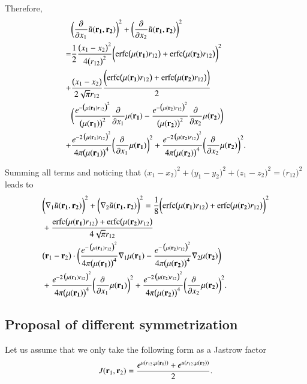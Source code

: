 \documentclass[aip,jcp,reprint,noshowkeys,superscriptaddress]{revtex4-1}
\newcommand{\deriv}[3]{\frac{\partial^{#3} #1}{\partial {#2}^{#3}}}
\newcommand{\bd}[1]{{\bf {#1}}}
\newcommand{\br}[0]{{\bf {r}}}
\newcommand{\bri}[1]{{\bf r}_{#1}}
\newcommand{\mur}[1]{\mu({\bf r_{#1}})}
\begin{document}
Therefore, 
\begin{equation}
 \begin{aligned}
& \bigg(\deriv{}{x_1}{}\tilde{u}(\bd{r_1},\bd{r_2}) \bigg)^2 + \bigg(\deriv{}{x_2}{}\tilde{u}(\bd{r_1},\bd{r_2}) \bigg)^2  \\
 = & \frac{1}{2}\frac{\big( x_1 - x_2 \big)^2}{4 \big(r_{12}\big)^2} \bigg(\text{erfc}\big(\mur{1} r_{12}\big) + \text{erfc}\big(\mur{2} r_{12}\big) \bigg)^2  \\
 + & \frac{\big(x_1 - x_2\big)}{2 \sqrt{\pi}r_{12}}  \frac{\bigg(\text{erfc}\big(\mur{1} r_{12}\big) + \text{erfc}\big(\mur{2} r_{12}\big) \bigg)}{2} \\
&\bigg(   \frac{e^{-\big(\mur{1} r_{12}\big)^2}}{\big(\mur{1}\big)^2} \deriv{}{x_1}{}\mur{1} 
- \frac{e^{-\big(\mur{2} r_{12}\big)^2}}{\big(\mur{2}\big)^2} \deriv{}{x_2}{}\mur{2} \bigg) \\
 + & \frac{e^{-2 \,\big(\mur{1}r_{12} \big)^2}}{4\pi \big(\mur{1}\big)^4} \bigg( \deriv{}{x_1}{}\mur{1} \bigg)^2 
 + \frac{e^{-2 \,\big(\mur{2}r_{12} \big)^2}}{4\pi \big(\mur{2}\big)^4} \bigg( \deriv{}{x_2}{}\mur{2} \bigg)^2.
 \end{aligned}
\end{equation}

Summing all terms and noticing that $\bigg(x_1 - x_2\bigg)^2 + \bigg(y_1 - y_2\bigg)^2 + \bigg(z_1 - z_2\bigg)^2 = \bigg(r_{12}\bigg)^2$ leads to 
\begin{equation}
 \begin{aligned}
& \bigg(\nabla_1\tilde{u}(\bd{r_1},\bd{r_2})\bigg)^2 + \bigg(\nabla_2\tilde{u}(\bd{r_1},\bd{r_2})\bigg)^2 = 
  \frac{1}{8}\bigg(\text{erfc}\big(\mur{1} r_{12}\big) + \text{erfc}\big(\mur{2} r_{12}\big) \bigg)^2  \\
&+\frac{\text{erfc}\big(\mur{1} r_{12}\big) + \text{erfc}\big(\mur{2} r_{12}\big)}{4 \sqrt{\pi}r_{12}}  \\
& \big( \bri{1} - \bri{2}\big)\cdot
\bigg(\frac{e^{- \,\big(\mur{1}r_{12} \big)^2}}{4\pi \big(\mur{1}\big)^4} \nabla_1 \mur{1}
  -   \frac{e^{- \,\big(\mur{2}r_{12} \big)^2}}{4\pi \big(\mur{2}\big)^4} \nabla_2 \mur{2}  \bigg) \\
  &+ \frac{e^{-2 \,\big(\mur{1}r_{12} \big)^2}}{4\pi \big(\mur{1}\big)^4} \bigg( \deriv{}{x_1}{}\mur{1} \bigg)^2 
 + \frac{e^{-2 \,\big(\mur{2}r_{12} \big)^2}}{4\pi \big(\mur{2}\big)^4} \bigg( \deriv{}{x_2}{}\mur{2} \bigg)^2.
 \end{aligned}
\end{equation}

\subsection{Proposal of different symmetrization}
Let us assume that we only take the following form as a Jastrow factor 
\begin{equation}
 J(\br_1,\br_2) = \frac{e^{ u(r_{12};\mur{1})} + e^{u(r_{12};\mur{2})}}{2}. 
\end{equation}
\end{document}
